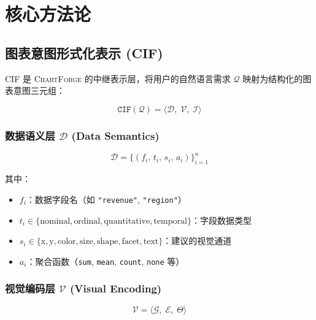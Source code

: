 \documentclass[12pt,a4paper]{ctexart}
\theoremstyle{remark}
\newcommand{\ChartForge}{\textsc{ChartForge}}
\newcommand{\CIF}{\texttt{CIF}}
\begin{document}
\section{核心方法论}

\subsection{图表意图形式化表示 (CIF)}\label{sec:cif}

CIF 是 \ChartForge{} 的中继表示层，将用户的自然语言需求 $\mathcal{Q}$ 映射为结构化的图表意图三元组：

\begin{equation}\label{eq:cif}
    \CIF(\mathcal{Q}) = \langle \mathcal{D},\; \mathcal{V},\; \mathcal{I} \rangle
\end{equation}

\subsubsection{数据语义层 $\mathcal{D}$ (Data Semantics)}

\begin{equation}
    \mathcal{D} = \big\{ (f_i,\, t_i,\, s_i,\, a_i) \big\}_{i=1}^{n}
\end{equation}

其中：
\begin{itemize}[leftmargin=*]
    \item $f_i$：数据字段名（如 \texttt{"revenue"}, \texttt{"region"}）
    \item $t_i \in \{\text{nominal}, \text{ordinal}, \text{quantitative}, \text{temporal}\}$：字段数据类型
    \item $s_i \in \{\text{x}, \text{y}, \text{color}, \text{size}, \text{shape}, \text{facet}, \text{text}\}$：建议的视觉通道
    \item $a_i$：聚合函数（\texttt{sum}, \texttt{mean}, \texttt{count}, \texttt{none} 等）
\end{itemize}

\subsubsection{视觉编码层 $\mathcal{V}$ (Visual Encoding)}

\begin{equation}
    \mathcal{V} = \langle \mathcal{G},\; \mathcal{E},\; \Theta \rangle
\end{equation}
\end{document}
